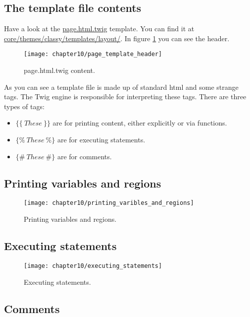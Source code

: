 \subsection{The template file contents}

Have a look at the \url{page.html.twig} template. You can find it at \url{core/themes/classy/templates/layout/}. In figure \ref{fig:page_template_header} you can see the header.

\begin{figure}[H]
	\centering
	\texttt{[image: chapter10/page\_template\_header]}
	\caption{page.html.twig content.}
	\label{fig:page_template_header}
\end{figure}

As you can see a template file is made up of standard html and some strange tags. The Twig engine is responsible for interpreting these tags. There are three types of tags:
\begin{itemize}
	\item $\{\{\ These\ \}\}$ are for printing content, either explicitly or via functions.
	\item $\{\%\ These\ \%\}$ are for executing statements.
	\item $\{\#\ These\ \#\}$ are for comments.
\end{itemize}

\subsection{Printing variables and regions}

\begin{figure}[H]
	\centering
	\texttt{[image: chapter10/printing\_varibles\_and\_regions]}
	\caption{Printing variables and regions.}
	\label{fig:printing_varibles_and_regions}
\end{figure}

\subsection{Executing statements}

\begin{figure}[H]
	\centering
	\texttt{[image: chapter10/executing\_statements]}
	\caption{Executing statements.}
	\label{fig:executing_statements}
\end{figure}

\subsection{Comments}

